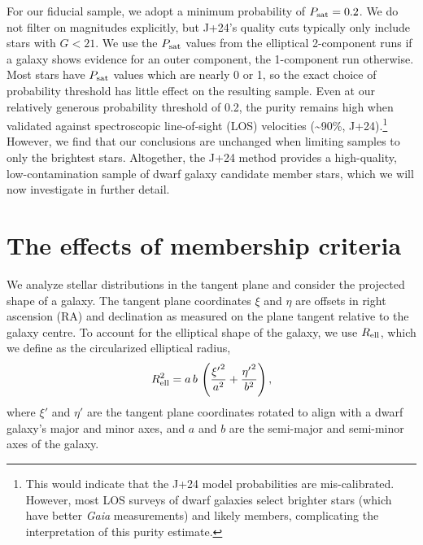 For our fiducial sample, we adopt a minimum probability of
\(P_{\rm sat} = 0.2\). We do not filter on magnitudes explicitly, but
J+24's quality cuts typically only include stars with \(G < 21\). We use
the \(P_{\rm sat}\) values from the elliptical 2-component runs if a
galaxy shows evidence for an outer component, the 1-component run
otherwise. Most stars have \(P_{\rm  sat}\) values which are nearly 0 or
1, so the exact choice of probability threshold has little effect on the
resulting sample. Even at our relatively generous probability threshold
of 0.2, the purity remains high when validated against spectroscopic
line-of-sight (LOS) velocities (\textasciitilde90\%, J+24).\footnote{This
  would indicate that the J+24 model probabilities are mis-calibrated.
  However, most LOS surveys of dwarf galaxies select brighter stars
  (which have better \emph{Gaia} measurements) and likely members,
  complicating the interpretation of this purity estimate.} However, we
find that our conclusions are unchanged when limiting samples to only
the brightest stars. Altogether, the J+24 method provides a
high-quality, low-contamination sample of dwarf galaxy candidate member
stars, which we will now investigate in further detail.

\section{The effects of membership
criteria}\label{the-effects-of-membership-criteria}

We analyze stellar distributions in the tangent plane and consider the
projected shape of a galaxy. The tangent plane coordinates \(\xi\) and
\(\eta\) are offsets in right ascension (RA) and declination as measured
on the plane tangent relative to the galaxy centre. To account for the
elliptical shape of the galaxy, we use \(R_{\rm ell}\), which we define
as the circularized elliptical radius, \begin{equation}{
R_{\rm ell}^2 = a\,b\,\left(\frac{{\xi'}^2}{a^2} + \frac{{\eta'}^2}{b^2} \right),
}\end{equation} where \(\xi'\) and \(\eta'\) are the tangent plane
coordinates rotated to align with a dwarf galaxy's major and minor axes,
and \(a\) and \(b\) are the semi-major and semi-minor axes of the
galaxy.


